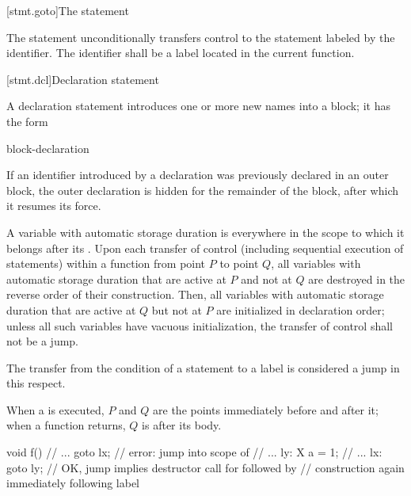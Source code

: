 [stmt.goto]{The  statement}%

\pnum
The  statement unconditionally transfers control to the
statement labeled by the identifier. The identifier shall be a
%
label located in the current function.

[stmt.dcl]{Declaration statement}%

\pnum
A declaration statement introduces one or more new names into a
block; it has the form
\begin{bnf}
\br
    block-declaration
\end{bnf}
\begin{note}
If an identifier introduced by a declaration was previously declared in
an outer block,
%
%
%
the outer declaration is hidden
for the remainder of the block,
after which it resumes its force.
\end{note}

\pnum
{}%
%
%
A variable with automatic storage duration
is  everywhere in the scope to which it belongs
after its .
%
%
Upon each transfer of control (including sequential execution of statements)
within a function from point $P$ to point $Q$,
all variables with automatic storage duration
that are active at $P$ and not at $Q$ are destroyed in the reverse order of their construction.
Then, all variables with automatic storage duration
that are active at $Q$ but not at $P$ are initialized in declaration order;
unless all such variables have vacuous initialization,
the transfer of control shall not be a jump.
\begin{footnote}
The transfer from the condition of a  statement to a
 label is considered a jump in this respect.
\end{footnote}
When a  is executed,
$P$ and $Q$ are the points immediately before and after it;
when a function returns, $Q$ is after its body.
\begin{example}
\begin{codeblock}
void f() {
  // ...
  goto lx;          // error: jump into scope of 
  // ...
ly:
  X a = 1;
  // ...
lx:
  goto ly;          // OK, jump implies destructor call for  followed by
                    // construction again immediately following label 
}
\end{codeblock}
\end{example}

